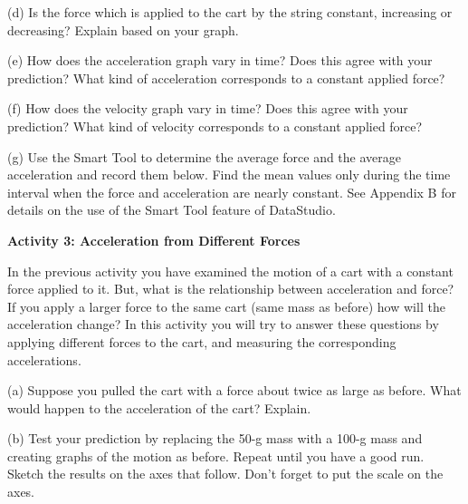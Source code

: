 (d) Is the force which is applied to the cart by the string constant, increasing
or decreasing? Explain based on your graph.
\vspace{20mm}

(e) How does the acceleration graph vary in time? Does this agree with your
prediction? What kind of acceleration corresponds to a constant applied force?
\vspace{20mm}

(f) How does the velocity graph vary in time? Does this agree with your prediction?
What kind of velocity corresponds to a constant applied force?
\vspace{20mm}

(g) Use the Smart Tool to determine the average force and the average acceleration
and record them below. Find the mean values only during the time interval when
the force and acceleration are nearly constant. See Appendix B for details on
the use of the Smart Tool feature of DataStudio.
\vspace{20mm}

\textbf{Activity 3: Acceleration from Different Forces }

In the previous activity you have examined the motion of a cart with a constant
force applied to it. But, what is the relationship between acceleration and
force? If you apply a larger force to the same cart (same mass as before) how
will the acceleration change? In this activity you will try to answer these
questions by applying different forces to the cart, and measuring the corresponding
accelerations. 

(a) Suppose you pulled the cart with a force about twice as large as before.
What would happen to the acceleration of the cart? Explain.
\vspace{20mm}

(b) Test your prediction by replacing the 50-g mass with a 100-g mass and creating graphs of the motion as before. Repeat until you have a good run. Sketch the
results on the axes that follow. Don't forget to put the scale on the axes.

